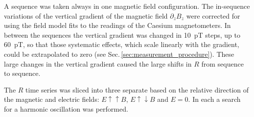 


A sequence was taken always in one magnetic field configuration. The in-sequence variations of the vertical gradient of the magnetic field $\partial_z B_z$ were corrected for using the field model fits to the readings of the Caesium magnetometers. In between the sequences the vertical gradient was changed in \SI{10}{\pico\tesla} steps, up to \SI{60}{\pico\tesla}, so that those systematic effects, which scale linearly with the gradient, could be extrapolated to zero (see Sec.\,\ref{sec:measurement_procedure}). These large changes in the vertical gradient caused the large shifts in $R$ from sequence to sequence.

The $R$ time series was sliced into three separate based on the relative direction of the magnetic and electric fields: $E \uparrow \uparrow B$, $E \uparrow \downarrow B$ and $E=0$. In each a search for a harmonic oscillation was performed.



